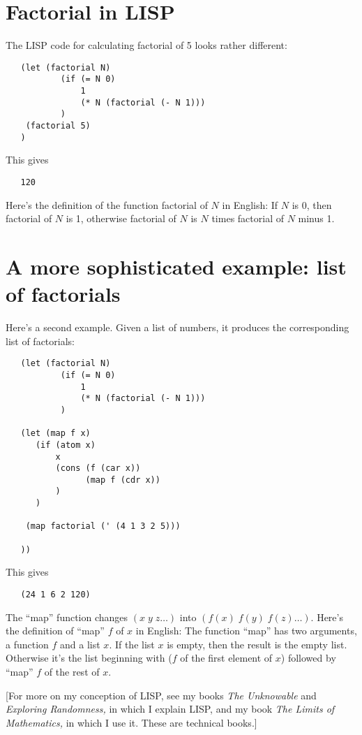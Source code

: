 \documentclass[12pt]{book}
\begin{document}
\section*{Factorial in LISP}

The LISP code for calculating factorial of 5 looks rather different:
\begin{verbatim}
   (let (factorial N) 
           (if (= N 0) 
               1 
               (* N (factorial (- N 1)))
           ) 
    (factorial 5)
   )
\end{verbatim}
This gives
\begin{verbatim}
   120
\end{verbatim}
 
Here's the definition of the function factorial of $N$ 
in English: 
If $N$ is 0, then
factorial of $N$ is 1, otherwise factorial of $N$ is $N$ times factorial of $N$ minus 1.

\section*{A more sophisticated example: list of factorials}

Here's a second example.
Given a list of numbers,
it produces the corresponding list of factorials:
\begin{verbatim}
   (let (factorial N) 
           (if (= N 0) 
               1 
               (* N (factorial (- N 1)))
           ) 

   (let (map f x)
      (if (atom x) 
          x 
          (cons (f (car x))
                (map f (cdr x))
          ) 
      ) 

    (map factorial (' (4 1 3 2 5)))

   ))
\end{verbatim}
This gives
\begin{verbatim}
   (24 1 6 2 120)
\end{verbatim}
 
The ``map'' function changes $(x \; y \; z\ldots)$ into $(f(x) \; f(y) \; f(z)\ldots)$.
Here's the definition of ``map'' $f$ of $x$
in English: The function ``map'' has two arguments, a function $f$ and a list $x$.
If the list $x$ is empty, then the result is the empty list.
Otherwise it's the list beginning with ($f$ of the
first element of $x$) followed by 
``map'' $f$ of the rest of $x$.
 
{\footnotesize
[For more on my conception of LISP, see my books \emph{The Unknowable}
and \emph{Exploring Randomness,} in which I explain LISP, and my book
\emph{The Limits of Mathematics,} in which I use it. These are technical books.]
}
\end{document}
